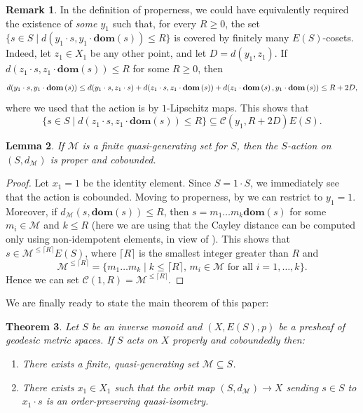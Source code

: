 \documentclass[svgnames]{amsart}
\theoremstyle{plain}
\newtheorem{thm}{Theorem}[section]
\newtheorem{lem}[thm]{Lemma}
\theoremstyle{definition}
\newtheorem{rem}[thm]{Remark}
\newcommand{\dom}[1]{\mathbf{dom}\left(#1\right)}
\begin{document}
\begin{rem}\label{rem:only_check_properness_once}
	In the definition of properness, we could have equivalently required the existence of \emph{some $y_1$} such that, for every $R\ge 0$, the set  $\{s \in S \mid d(y_1 \cdot s, y_1\cdot \dom{s})\le R\}$ is covered by finitely many $E(S)$-cosets. Indeed, let $z_1\in X_1$ be any other point, and let $D=d(y_1,z_1)$. If $d(z_1 \cdot s, z_1\cdot \dom{s})\le R$ for some $R\ge 0$, then 
    $$d(y_1 \cdot s, y_1\cdot \dom{s})\\
    \le d(y_1 \cdot s, z_1\cdot s)+d(z_1 \cdot s, z_1\cdot \dom{s})+d(z_1 \cdot \dom{s}, y_1\cdot \dom{s})\\
    \le R+2D,$$
    where we used that the action is by $1$-Lipschitz maps. This shows that 
    \[
		\{ s \in S \mid d(z_1 \cdot s, z_1\cdot \dom{s})\le R\}\subseteq \mathcal{C}(y_1,R+2D) E(S).
	\]
\end{rem}

\begin{lem}
    If $\mathcal{M}$ is a finite quasi-generating set for $S$, then the $S$-action on $(S,d_{\mathcal{M}})$ is proper and cobounded.
\end{lem}


\begin{proof}
Let $x_1=1$ be the identity element. Since $S=1\cdot S$, we immediately see that the action is cobounded. Moving to properness, by  we can restrict to $y_1=1$. Moreover, if $d_{\mathcal{M}}(s,\dom{s})\le R$, then $s=m_1\ldots m_k \dom{s}$ for some $m_i\in \mathcal{M}$ and $k\le R$ (here we are using that the Cayley distance can be computed only using non-idempotent elements, in view of ). This shows that $s\in \mathcal{M}^{\le\lceil R\rceil}E(S)$, where $\lceil R\rceil$ is the smallest integer greater than $R$ and 
$$\mathcal{M}^{\le\lceil R\rceil}=\{m_1\ldots m_k\mid k\le \lceil R\rceil,\, m_i\in \mathcal M\mbox{ for all }i=1,\ldots,k\}.$$ Hence we can set $\mathcal{C}(1,R)=\mathcal{M}^{\le\lceil R\rceil}$.
\end{proof}


\noindent We are finally ready to state the main theorem of this paper:
\begin{thm}\label{thm:MilnorSchwarz}
	Let $S$ be an inverse monoid and $(X, E(S),p)$ be a presheaf of geodesic metric spaces. 
	If $S$ acts on $X$ properly and coboundedly then:
    \begin{enumerate}
        \item There exists a finite, quasi-generating set $\mathcal{M}\subseteq S$.
        \item\label{item:MS:qi} There exists $x_1\in X_1$ such that the orbit map $(S,d_{\mathcal{M}})\to X$ sending $s\in S$ to $x_1\cdot s$ is an order-preserving quasi-isometry.
    \end{enumerate}
\end{thm}
\end{document}

